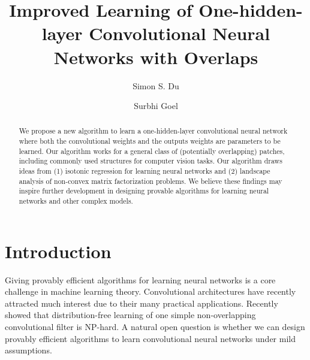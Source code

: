 \documentclass[11pt]{article}
\title{Improved Learning of One-hidden-layer Convolutional Neural Networks with Overlaps}
\author[1]{Simon S. Du}
\author[2]{Surbhi Goel}
\affil[1]{Machine Learning Department, Carnegie Mellon University}
\affil[2]{Department of Computer Science, University of Texas at Austin}
\begin{document}
\maketitle
\begin{abstract}
We propose a new algorithm to learn a one-hidden-layer convolutional neural network where both the convolutional weights and the outputs weights are parameters to be learned. Our algorithm works for a general class of (potentially overlapping) patches, including commonly used structures for computer vision tasks. Our algorithm draws ideas from (1) isotonic regression for learning neural networks and (2) landscape analysis of non-convex matrix factorization problems. We believe these findings may inspire further development in designing provable algorithms for learning neural networks and other complex models.

\end{abstract}

\section{Introduction}
\label{sec:intro}
Giving provably efficient algorithms for learning neural networks is a core challenge in machine learning theory.  Convolutional architectures have recently attracted much interest due to their many practical applications.  Recently \citet{brutzkus2017globally} showed that distribution-free learning of one simple non-overlapping convolutional filter is NP-hard.  A natural open question is whether we can design provably efficient algorithms to learn convolutional neural networks under mild assumptions. 
\end{document}
